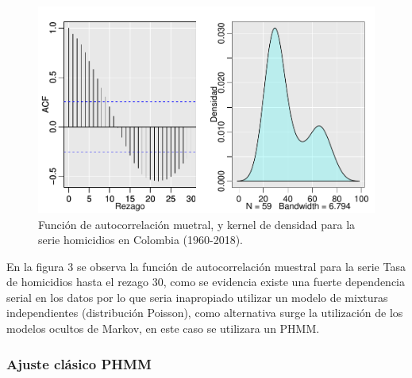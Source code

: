 \documentclass[a4paper]{article}\usepackage[]{graphicx}\usepackage[]{color}
\makeatletter
\def\maxwidth{ %
  \ifdim\Gin@nat@width>\linewidth
    \linewidth
  \else
    \Gin@nat@width
  \fi
}
\newenvironment{knitrout}{}{} %
\makeatother
\begin{document}
\begin{knitrout}
\color{fgcolor}\begin{figure}
\includegraphics[width=\maxwidth]{figure/unnamed-chunk-8-1} \caption[Función de autocorrelación muetral, y kernel de densidad para la serie homicidios en Colombia (1960-2018)]{Función de autocorrelación muetral, y kernel de densidad para la serie homicidios en Colombia (1960-2018).}\label{fig:unnamed-chunk-8}
\end{figure}


\end{knitrout}

En la figura 3 se observa la función de autocorrelación muestral para la serie Tasa de homicidios hasta el rezago 30, como se evidencia existe una fuerte dependencia serial en los datos por lo que seria inapropiado utilizar un modelo de mixturas independientes (distribución Poisson), como alternativa surge la utilización de los modelos ocultos de Markov, en este caso se utilizara un PHMM.


\subsubsection*{Ajuste clásico PHMM}
\end{document}
